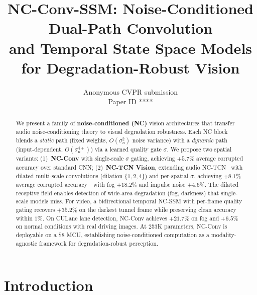 \documentclass[10pt,twocolumn,letterpaper]{article}
\def\cvprPaperID{****}
\begin{document}
\title{NC-Conv-SSM: Noise-Conditioned Dual-Path Convolution\\and Temporal State Space Models for Degradation-Robust Vision}

\author{Anonymous CVPR submission\\Paper ID \cvprPaperID}

\maketitle

\begin{abstract}
We present a family of \textbf{noise-conditioned (NC)} vision architectures that transfer audio noise-conditioning theory to visual degradation robustness.
Each NC block blends a \textcolor{fixcolor}{\emph{static}} path (fixed weights, $O(\sigma_n^2)$ noise variance) with a \textcolor{dyncolor}{\emph{dynamic}} path (input-dependent, $O(\sigma_n^{4+})$) via a learned quality gate $\sigma$.
We propose two spatial variants:
(1)~\textbf{NC-Conv} with single-scale $\sigma$ gating, achieving $+5.7\%$ average corrupted accuracy over standard CNN;
(2)~\textbf{NC-TCN Vision}, extending audio NC-TCN~\cite{choi2026ncssm} with \textcolor{tcncolor}{dilated multi-scale} convolutions (dilation $\{1,2,4\}$) and per-spatial $\sigma$, achieving $\mathbf{+8.1\%}$ average corrupted accuracy---with fog $+18.2\%$ and impulse noise $+4.6\%$.
The dilated receptive field enables detection of wide-area degradation (fog, darkness) that single-scale models miss.
For video, a \textcolor{tempcolor}{bidirectional temporal NC-SSM} with per-frame quality gating recovers $\mathbf{+35.2\%}$ on the darkest tunnel frame while preserving clean accuracy within $1\%$.
On CULane lane detection, NC-Conv achieves $+21.7\%$ on fog and $+6.5\%$ on normal conditions with real driving images.
At 253K parameters, NC-Conv is deployable on a \$8 MCU, establishing noise-conditioned computation as a modality-agnostic framework for degradation-robust perception.
\end{abstract}

\section{Introduction}
\label{sec:intro}
\end{document}
